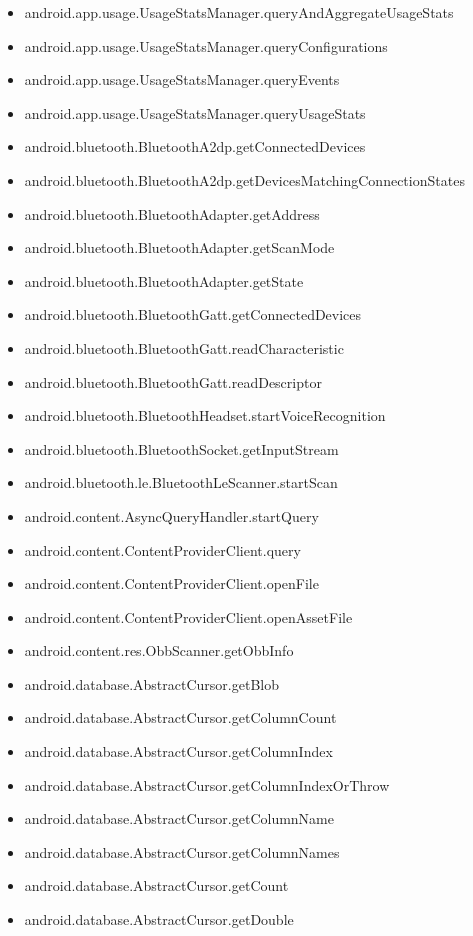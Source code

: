 \documentclass{sig-alternate}
\begin{document}
\begin{itemize}
\item android.app.usage.UsageStatsManager.queryAndAggregateUsageStats
\item android.app.usage.UsageStatsManager.queryConfigurations
\item android.app.usage.UsageStatsManager.queryEvents
\item android.app.usage.UsageStatsManager.queryUsageStats
\item android.bluetooth.BluetoothA2dp.getConnectedDevices
\item android.bluetooth.BluetoothA2dp.getDevicesMatchingConnectionStates
\item android.bluetooth.BluetoothAdapter.getAddress
\item android.bluetooth.BluetoothAdapter.getScanMode
\item android.bluetooth.BluetoothAdapter.getState
\item android.bluetooth.BluetoothGatt.getConnectedDevices
\item android.bluetooth.BluetoothGatt.readCharacteristic
\item android.bluetooth.BluetoothGatt.readDescriptor
\item android.bluetooth.BluetoothHeadset.startVoiceRecognition
\item android.bluetooth.BluetoothSocket.getInputStream
\item android.bluetooth.le.BluetoothLeScanner.startScan
\item android.content.AsyncQueryHandler.startQuery
\item android.content.ContentProviderClient.query
\item android.content.ContentProviderClient.openFile
\item android.content.ContentProviderClient.openAssetFile
\item android.content.res.ObbScanner.getObbInfo
\item android.database.AbstractCursor.getBlob
\item android.database.AbstractCursor.getColumnCount
\item android.database.AbstractCursor.getColumnIndex
\item android.database.AbstractCursor.getColumnIndexOrThrow
\item android.database.AbstractCursor.getColumnName
\item android.database.AbstractCursor.getColumnNames
\item android.database.AbstractCursor.getCount
\item android.database.AbstractCursor.getDouble

\end{itemize}
\end{document}
